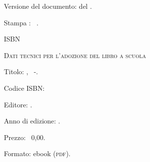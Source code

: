 {{\vspace{2ex}
 Versione del documento: {\docvers} del {\oggi}.

 Stampa \edizione : \mese\ \anno.

 ISBN \mcisbn

\vspace{2ex}
 {\scshape{Dati tecnici per l'adozione del libro a scuola}}

 Titolo: \serie, \titolo\ -\edizione.

 Codice ISBN: \mcisbn 

 Editore: \href{http://www.matematicamente.it}{\editore}. 

 Anno di edizione: \anno.

 Prezzo: \officialeuro\ 0,00.

 Formato: ebook (\scshape{pdf}).
}}
\cleardoublepage
